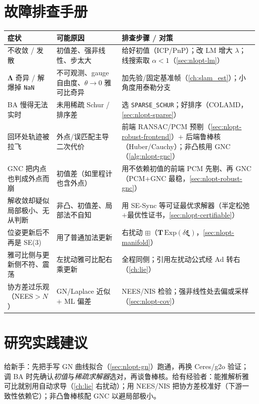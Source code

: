 \section*{故障排查手册}
\begin{table}[H]\centering\small
\begin{tabular}{p{} p{} p{}}
\toprule
症状 & 可能原因 & 排查步骤 / 对策 \\
\midrule
不收敛 / 发散 & 初值差、强非线性、步太大 & 给好初值（ICP/PnP）；改 LM 增大 $\lambda$；线搜索取 $\alpha<1$（\cref{sec:nlopt-lm}）\\
$\boldsymbol{\Lambda}$ 奇异 / 解爆掉 \texttt{NaN} & 不可观测、gauge 自由度、$\theta\to0$ 雅可比奇异 & 加先验/固定基准帧（\cref{ch:slam_est}）；小角度用泰勒分支 \\
BA 慢得无法实时 & 未用稀疏 Schur / 排序差 & 选 \texttt{SPARSE\_SCHUR}；好排序（COLAMD，\cref{sec:nlopt-sparse}）\\
回环处轨迹被拉飞 & 外点/误匹配主导二次代价 & 前端 RANSAC/PCM 预剔（\cref{sec:nlopt-robust-frontend}）$+$ 后端鲁棒核（Huber/Cauchy）；非凸核用 GNC（\cref{alg:nlopt-gnc}）\\
GNC 把内点也判成外点而崩 & 初值差（如里程计也含外点）& 用不依赖初值的前端 PCM 先剔、再 GNC（PCM$+$GNC 最稳，\cref{sec:nlopt-robust-gnc}）\\
解收敛却疑似局部极小、无从判断 & 非凸、初值差、局部法不自知 & 用 SE-Sync 等可证最优求解器（半定松弛$+$最优性证书，\cref{sec:nlopt-certifiable}）\\
位姿更新后不再是 SE(3) & 用了普通加法更新 & 右扰动 $\boxplus$（$\mathbf{T}\,\mathrm{Exp}(\delta\boldsymbol{\xi})$，\cref{sec:nlopt-manifold}）\\
雅可比侧与更新侧不符、震荡 & 左扰动雅可比配右乘更新 & 全程同侧；引用左扰动公式经 $\mathrm{Ad}$ 转右（\cref{ch:lie}）\\
协方差过乐观（NEES$>N$）& GN/Laplace 近似 $+$ ML 偏差 & NEES/NIS 检验；强非线性处去偏或采样（\cref{sec:nlopt-cov}）\\
\bottomrule
\end{tabular}
\end{table}

\section*{研究实践建议}
给新手：先把手写 GN 曲线拟合（\cref{sec:nlopt-gn}）跑通，再换 Ceres/g2o 验证；调 BA 时先确认\emph{初值}与\emph{稀疏求解器}选对，再谈鲁棒核。给有经验者：能推解析雅可比就别用自动求导（\cref{ch:lie} 右扰动）；用 NEES/NIS 把协方差校准好（下游一致性依赖它）；非凸鲁棒核配 GNC 以避局部极小。

